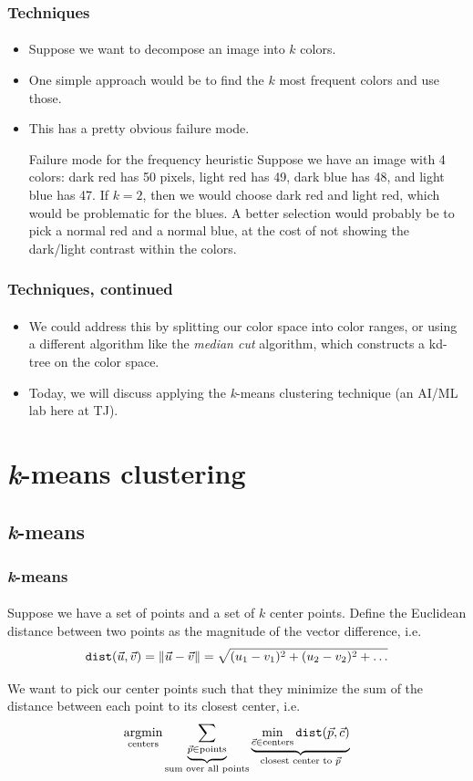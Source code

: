 \documentclass{beamer}                             %
\DeclareMathOperator*{\argmin}{argmin}
\begin{document}
\begin{frame}
\frametitle{Techniques}
\framesubtitle{}
\begin{itemize}[<+->]
  \item Suppose we want to decompose an image into \( k \) colors.
  \item One simple approach would be to find the
    \( k \) most frequent colors and use those.
  \item This has a pretty obvious failure mode.    
    \begin{exampleblock}{Failure mode for the frequency heuristic}
      Suppose we have an image with 4 colors: dark red has 50 pixels, light red
      has 49, dark blue has 48, and light blue has 47. If \( k = 2 \), then we
      would choose dark red and light red, which would be problematic for the
      blues. A better selection would probably be to pick a normal red and a
      normal blue, at the cost of not showing the dark/light contrast within
      the colors.
    \end{exampleblock}
\end{itemize}
\end{frame}

\begin{frame}
\frametitle{Techniques, continued}
\framesubtitle{}
\begin{itemize}[<+->]
  \item We could address this by splitting our color space into
    color ranges, or using a different algorithm like the \emph{median cut}
    algorithm, which constructs a kd-tree on the color space.
  \item Today, we will discuss applying the \textit{k}-means
    clustering technique (an AI/ML lab here at TJ).
\end{itemize}
\end{frame}

\section{\textit{k}-means clustering}
\subsection{\textit{k}-means}
\begin{frame}
\frametitle{\textit{k}-means}
\framesubtitle{}
Suppose we have a set of points and a set of \( k \) \alert{center} points.
Define the \alert{Euclidean distance} between two points
as the magnitude of the vector difference, i.e.
\[ \texttt{dist}(\vec{u}, \vec{v}) = \norm{\vec{u} - \vec{v}}
= \sqrt{(u_1 - v_1)^2 + (u_2 - v_2)^2 + \dots} \] \pause 

We want to pick our center points such that they minimize the sum of the
distance between each point to its closest center, i.e.
\[ \argmin_{\text{centers}}
  \underbrace{\sum_{\vec{p} \in \text{points}}}_{\text{sum over all points}}
  \underbrace{\min_{\vec{c} \in \text{centers}} \texttt{dist}(\vec{p}, \vec{c})}_
{\text{closest center to \( \vec{p} \)}} \]
\end{frame}
\end{document}
